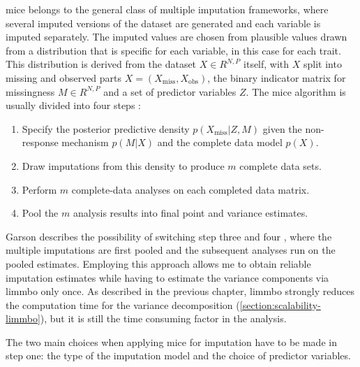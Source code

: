 \gls{mice} belongs to the general class of multiple imputation frameworks, where several imputed versions of the dataset are generated and each variable is imputed separately. The imputed values are chosen from plausible values drawn from a distribution that is specific for each variable, in this case for each trait. This distribution is derived from the dataset \(X \in R^{N,P}\) itself,  with \(X\) split into missing and observed parts \(X = (X_\text{miss}, X_\text{obs})\), the binary indicator matrix for missingness \(M \in R^{N,P}\) and a set of predictor variables \(Z\). The \gls{mice} algorithm is usually divided into four steps \citep{Rubin1987,vanBuuren1999,Pigott2001}:
\begin{enumerate}
\item Specify the posterior predictive density \(p(X_\text{miss} | Z, M)\) given the non-response mechanism  \(p(M | X)\)  and the complete data model  \(p(X)\).
\item Draw imputations from this density to produce \(m\) complete data sets. 
\item Perform \(m\) complete-data analyses on each completed data matrix. 
\item Pool the \(m\) analysis results into final point and variance estimates.
\end{enumerate}
Garson describes the possibility of switching step three and four \citeyear{Garson2015}, where the multiple imputations are first pooled and the subsequent analyses run on the pooled estimates. Employing this approach allows me to  obtain reliable imputation estimates while having to estimate the variance components via \gls{limmbo} only once. As described in the previous chapter, \gls{limmbo} strongly reduces the computation time for the variance decomposition (\cref{section:scalability-limmbo}), but it is still the time consuming factor in the analysis. 

The two main choices when applying \gls{mice} for imputation have to be made in step one: the type of the imputation model and the choice of predictor variables. 

